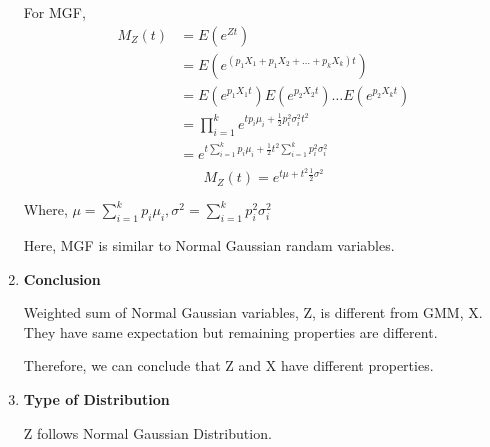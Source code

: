 \documentclass[12pt]{article}
\begin{document}
\begin{enumerate}
For MGF,
\begin{equation}
    \begin{split}
        M_Z(t)& = E(e^{Zt}) \\
        & = E(e^{(p_1X_1+p_1X_2+\dots+p_kX_k)t}) \\
        & = E(e^{p_1X_1t})E(e^{p_2X_2t})\dots E(e^{p_2X_kt}) \\
        & = \prod_{i=1}^k e^{tp_i\mu_i+\frac{1}{2}p_i^2\sigma^2_it^2} \\
        & = e^{t\sum_{i=1}^kp_i\mu_i + \frac{1}{2}t^2\sum_{i=1}^kp_i^2\sigma^2_i} \\
    \end{split}
\end{equation}
\begin{equation}
    M_Z(t) = e^{t\mu+t^2\frac{1}{2}\sigma^2}
\end{equation}
\begin{center}
    Where,  
          $\mu = \sum_{i=1}^kp_i\mu_i,   \sigma^2 = \sum_{i=1}^kp_i^2\sigma^2_i$
\end{center}

Here, MGF is similar to Normal Gaussian randam variables.
    \item \textbf{Conclusion}

Weighted sum of Normal Gaussian variables, Z, is different from GMM, X. They have same expectation but remaining properties are different.

Therefore, we can conclude that Z and X have different properties.

    \item \textbf{Type of Distribution}

Z follows Normal Gaussian Distribution.
\end{enumerate}
\end{document}
